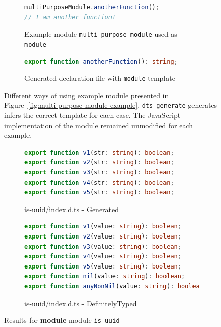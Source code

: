 \documentclass[a4paper,english,cleveref, autoref]{lipics-v2019}
\newcommand{\figref}[1]{Figure~\ref{#1}}
\begin{document}
\begin{figure}[tp]
\begin{subfigure}{0.48\linewidth}
\begin{lstlisting}[language=JavaScript]
multiPurposeModule.anotherFunction();
// I am another function!
      \end{lstlisting}
      \caption{Example module \texttt{multi-purpose-module} used as \texttt{module}}
    \end{subfigure}
    \hfill
    \begin{subfigure}{0.48\linewidth}
      \begin{lstlisting}[language=TypeScript]
export function anotherFunction(): string;
      \end{lstlisting}
      \caption{Generated declaration file with \texttt{module} template}
    \end{subfigure}

  \caption{Different ways of using example module presented in \figref{fig:multi-purpose-module-example}. \texttt{dts-generate} generates infers the correct template for each case. The JavaScript implementation of the module remained unmodified for each example.}
  \label{fig:dts-generate-choose-templates}
\end{figure}


\begin{figure}[tp]
  \centering
  \begin{subfigure}{0.48\linewidth}
    \begin{lstlisting}[language=TypeScript]
export function v1(str: string): boolean;
export function v2(str: string): boolean;
export function v3(str: string): boolean;
export function v4(str: string): boolean;
export function v5(str: string): boolean;
    \end{lstlisting}
    \caption{is-uuid/index.d.ts - Generated}
  \end{subfigure}
  \hfill
  \begin{subfigure}{0.48\linewidth}
    \begin{lstlisting}[language=TypeScript]
export function v1(value: string): boolean;
export function v2(value: string): boolean;
export function v3(value: string): boolean;
export function v4(value: string): boolean;
export function v5(value: string): boolean;
export function nil(value: string): boolean;
export function anyNonNil(value: string): boolean;
    \end{lstlisting}
    \caption{is-uuid/index.d.ts - DefinitelyTyped}
  \end{subfigure}

  \caption{Results for \textbf{module}  module \texttt{is-uuid}}
  \label{fig:experiments-results-module-is-uuid}
\end{figure}
\end{document}

